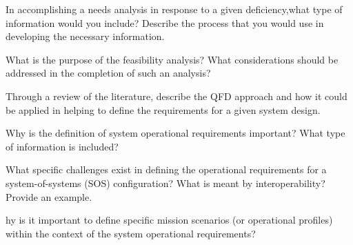 \begin{exercises}
    \begin{exercise}
    \label{sea-03-01}
        In accomplishing a needs analysis in response to a given deficiency,what type of information would you include? Describe the process that you would use in developing the necessary information.
    \end{exercise}
    \begin{solution}
    \end{solution}
    
    \begin{exercise}
    \label{sea-03-02}
        What is the purpose of the feasibility analysis? What considerations should be addressed in the completion of such an analysis?
    \end{exercise}
    \begin{solution}
    \end{solution}
    
    \begin{exercise}
    \label{sea-03-03}
        Through a review of the literature, describe the QFD approach and how it could be applied in helping to define the requirements for a given system design.
    \end{exercise}
    \begin{solution}
    \end{solution}
    
    \begin{exercise}
    \label{sea-03-04}
        Why is the definition of system operational requirements important? What type of information is included?
    \end{exercise}
    \begin{solution}
    \end{solution}
    
    \begin{exercise}
    \label{sea-03-05}
        What specific challenges exist in defining the operational requirements for a system-of-systems (SOS) configuration? What is meant by interoperability? Provide an example.
    \end{exercise}
    \begin{solution}
    \end{solution}
    
    \begin{exercise}
    \label{sea-03-06}
        hy is it important to define specific mission scenarios (or operational profiles) within the context of the system operational requirements?
    \end{exercise}
    \begin{solution}
    \end{solution}
    

\end{exercises}
